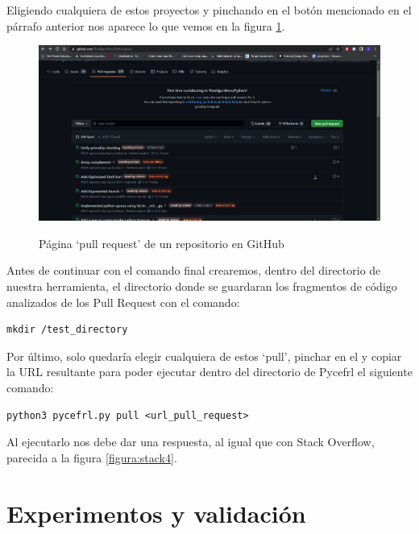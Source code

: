 \documentclass[a4paper, 12pt]{book}
\begin{document}
Eligiendo cualquiera de estos proyectos y pinchando en el botón mencionado en el párrafo anterior nos aparece lo que vemos en la figura \ref{figura:git4}.

\begin{figure}
    \includegraphics[bb=0 0 800 600, width=12cm, keepaspectratio]{img/git4}
    \label{figura:git4}
    \caption{Página `pull request' de un repositorio en GitHub}
 \end{figure}
 
Antes de continuar con el comando final crearemos, dentro del directorio de nuestra herramienta, el directorio donde se guardaran los fragmentos de código analizados de los Pull Request con el comando:

\begin{verbatim}
mkdir /test_directory
\end{verbatim}
 
Por último, solo quedaría elegir cualquiera de estos `pull', pinchar en el y copiar la URL resultante para poder ejecutar dentro del directorio de Pycefrl el siguiente comando:

\begin{verbatim}
python3 pycefrl.py pull <url_pull_request>
\end{verbatim}

Al ejecutarlo nos debe dar una respuesta, al igual que con Stack Overflow, parecida a la figura \ref{figura:stack4}. 


\cleardoublepage
\chapter{Experimentos y validación}
\end{document}
